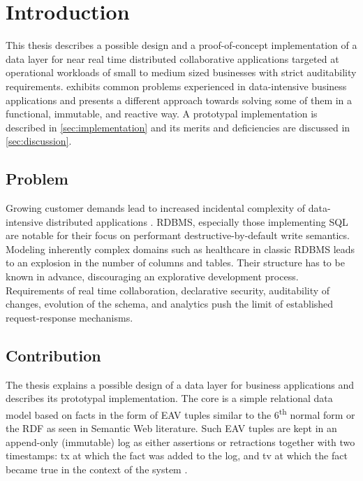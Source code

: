 \section{Introduction}

This thesis describes a possible design and a proof-of-concept implementation of a data layer for near real time distributed collaborative applications targeted at operational workloads of small to medium sized businesses with strict auditability requirements.  exhibits common problems experienced in data-intensive business applications and presents a different approach towards solving some of them in a functional, immutable, and reactive way. A prototypal implementation is described in \autoref{sec:implementation} and its merits and deficiencies are discussed in \autoref{sec:discussion}.

\subsection{Problem}
Growing customer demands lead to increased incidental complexity of data-intensive distributed applications \cite{kleppmann2017designing}. \gls{RDBMS}, especially those implementing \gls{SQL} are notable for their focus on performant destructive-by-default write semantics. Modeling inherently complex domains such as healthcare in classic RDBMS leads to an explosion in the number of columns and tables. Their structure has to be known in advance, discouraging an explorative development process. Requirements of real time collaboration, declarative security, auditability of changes, evolution of the schema, and analytics push the limit of established request-response mechanisms.


\subsection{Contribution}
The thesis explains a possible design of a data layer for business applications and describes its prototypal implementation. The core is a simple relational data model based on facts in the form of \gls{EAV} tuples similar to the 6\textsuperscript{th} normal form or the \gls{RDF} as seen in Semantic Web literature. Such EAV tuples are kept in an append-only (immutable) log as either assertions or retractions together with two timestamps: \gls{tx} at which the fact was added to the log, and \gls{tv} at which the fact became true in the context of the system \cite{snodgrass1992temporal}.



